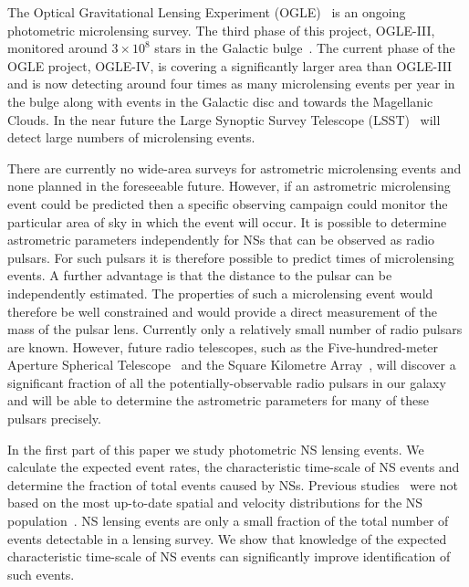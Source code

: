 \documentclass[iop,apj]{emulateapj}
\begin{document}
The Optical Gravitational Lensing Experiment (OGLE)~\citep{Udalski} is an ongoing 
photometric microlensing survey.    
%
The third phase of this project, OGLE-III, monitored around $3\times10^{8}$ 
stars in the Galactic bulge~\citep{Szymanski}.  
The current phase of the OGLE project, OGLE-IV, is covering a significantly larger area 
than OGLE-III and is now detecting around four times as many microlensing events per year 
in the bulge along with events in the Galactic disc and towards the Magellanic Clouds.   
In the near future the Large Synoptic Survey Telescope (LSST)~\citep[for more detailed 
discussion see the LSST Science Book;][]{lsst} will detect large numbers of microlensing events. 

There are currently no wide-area surveys for astrometric microlensing events and none 
planned in the foreseeable future. However, if an astrometric microlensing event could be 
predicted then a specific observing campaign could monitor the particular area of sky in 
which the event will occur. It is possible to determine astrometric parameters independently 
for NSs that can be observed as radio pulsars.  For such pulsars it is therefore possible 
to predict times of microlensing events. A further advantage is that the distance to 
the pulsar can be independently estimated. The properties of such a microlensing event 
would therefore be well constrained and would provide a direct measurement of the mass of
the pulsar lens. Currently only a relatively small number of radio pulsars are known.  
However, future radio telescopes, such as the Five-hundred-meter Aperture Spherical 
Telescope~\citep[FAST,][]{Nan} and the Square Kilometre Array~\citep[SKA,][]{Johnston2007}, 
will discover a significant fraction of all the potentially-observable radio pulsars in our galaxy and will
be able to determine the astrometric parameters for many of these pulsars precisely. 


In the first part of this paper we study photometric NS lensing events. We calculate 
the expected event rates, the characteristic time-scale of NS events and determine the 
fraction of total events caused by NSs.  Previous studies~\citep[e.g.,][hereafter WM05]{Sartore10,wood}  
were not based on the most up-to-date spatial and velocity distributions for the 
NS population~\citep[e.g.,][]{hobbs,Lorimer06,Faucher}. NS lensing events are only 
a small fraction of the total number of events detectable in a lensing survey. We 
show that knowledge of the expected characteristic time-scale of NS events can significantly 
improve identification of such events.  
\end{document}
